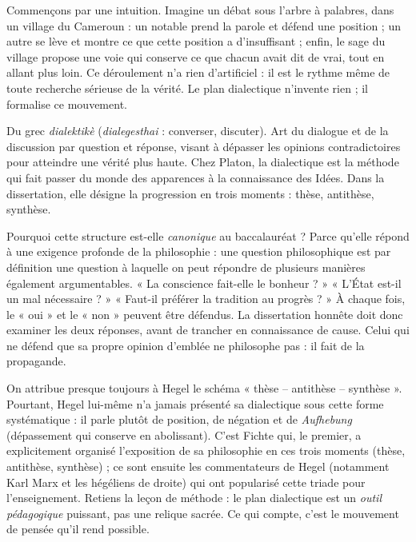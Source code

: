 \documentclass[11pt]{article}
\begin{document}
Commençons par une intuition. Imagine un débat sous l'arbre à palabres, dans un village du Cameroun : un notable prend la parole et défend une position ; un autre se lève et montre ce que cette position a d'insuffisant ; enfin, le sage du village propose une voie qui conserve ce que chacun avait dit de vrai, tout en allant plus loin. Ce déroulement n'a rien d'artificiel : il est le rythme même de toute recherche sérieuse de la vérité. Le plan dialectique n'invente rien ; il formalise ce mouvement.

\begin{definition}[La dialectique]
Du grec \emph{dialektikè} (\emph{dialegesthai} : converser, discuter). Art du dialogue et de la discussion par question et réponse, visant à dépasser les opinions contradictoires pour atteindre une vérité plus haute. Chez Platon, la dialectique est la méthode qui fait passer du monde des apparences à la connaissance des Idées. Dans la dissertation, elle désigne la progression en trois moments : thèse, antithèse, synthèse.
\end{definition}

Pourquoi cette structure est-elle \emph{canonique} au baccalauréat ? Parce qu'elle répond à une exigence profonde de la philosophie : une question philosophique est par définition une question à laquelle on peut répondre de plusieurs manières également argumentables. « La conscience fait-elle le bonheur ? » « L'État est-il un mal nécessaire ? » « Faut-il préférer la tradition au progrès ? » À chaque fois, le « oui » et le « non » peuvent être défendus. La dissertation honnête doit donc examiner les deux réponses, avant de trancher en connaissance de cause. Celui qui ne défend que sa propre opinion d'emblée ne philosophe pas : il fait de la propagande.

\begin{savaistu}
On attribue presque toujours à Hegel le schéma « thèse -- antithèse -- synthèse ». Pourtant, Hegel lui-même n'a jamais présenté sa dialectique sous cette forme systématique : il parle plutôt de position, de négation et de \emph{Aufhebung} (dépassement qui conserve en abolissant). C'est Fichte qui, le premier, a explicitement organisé l'exposition de sa philosophie en ces trois moments (thèse, antithèse, synthèse) ; ce sont ensuite les commentateurs de Hegel (notamment Karl Marx et les hégéliens de droite) qui ont popularisé cette triade pour l'enseignement. Retiens la leçon de méthode : le plan dialectique est un \emph{outil pédagogique} puissant, pas une relique sacrée. Ce qui compte, c'est le mouvement de pensée qu'il rend possible.
\end{savaistu}
\end{document}
